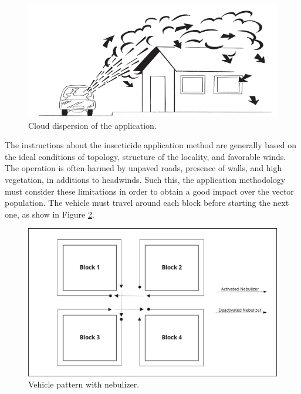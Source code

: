 \documentclass[a4paper,11pt]{article}
\begin{document}
\begin{figure}[!ht]
  \centering
  \includegraphics[scale=0.4]{cloud-dispersion.png}
  \caption{Cloud dispersion of the application.}
  \label{fig:dispersion}
\end{figure}

The instructions about the insecticide application method are generally based on
the  ideal conditions  of topology,  structure  of the  locality, and  favorable
winds. The  operation is often harmed  by unpaved roads, presence  of walls, and
high  vegetation,  in  additions  to   headwinds.  Such  this,  the  application
methodology must  consider these limitations  in order  to obtain a  good impact
over the  vector population. The  vehicle must  travel around each  block before
starting the next one, as show in Figure \ref{fig:travel-pattern}.

\begin{figure}[!ht]
  \centering
  \includegraphics[scale=0.25]{visit-pattern.jpg}
  \caption{Vehicle pattern with nebulizer.}
  \label{fig:travel-pattern}
\end{figure}
\end{document}
